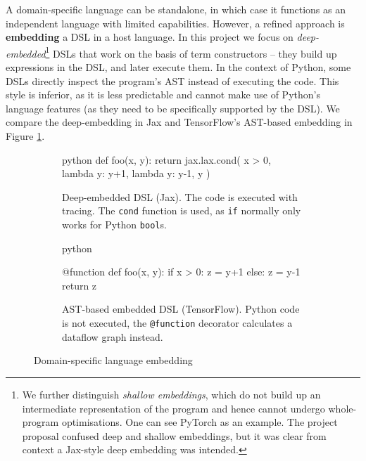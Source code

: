 A domain-specific language can be standalone, in which case it functions as an independent language with limited capabilities. 
However, a refined approach is \textbf{embedding} a DSL in a host language. 
In this project we focus on \textit{deep-embedded}\footnote{We further distinguish \textit{shallow embeddings}, which do not build up an intermediate representation of the program \cite{gibbons2014folding} and hence cannot undergo whole-program optimisations. One can see PyTorch as an example. The project proposal confused deep and shallow embeddings, but it was clear from context a Jax-style deep embedding was intended.} DSLs that work on the basis of term constructors -- they build up expressions in the DSL, and later execute them. 
In the context of Python, some DSLs directly inspect the program's AST instead of executing the code. 
This style is inferior, as it is less predictable and cannot make use of Python's language features (as they need to be specifically supported by the DSL). 
We compare the deep-embedding in Jax and TensorFlow's AST-based embedding in Figure \ref{fig:embeddings}.

\begin{figure}
\centering
\begin{subfigure}{.4\textwidth}
  \centering
  \begin{cminted}{python}
def foo(x, y):
  return jax.lax.cond(
    x > 0, 
    lambda y: y+1, 
    lambda y: y-1, 
    y
  )
  \end{cminted}
  \caption{Deep-embedded DSL (Jax). The code is executed with tracing. The \texttt{cond} function is used, as \texttt{if} normally only works for Python \texttt{bool}s.}
\end{subfigure} \quad %
\begin{subfigure}{.4\textwidth}
  \centering
    \begin{cminted}{python}

@function
def foo(x, y):
  if x > 0: z = y+1
  else:     z = y-1
  return z

    \end{cminted}
      \caption{AST-based embedded DSL (TensorFlow). Python code is not executed, the \texttt{@function} decorator calculates a dataflow graph instead.}
\end{subfigure}
\caption{Domain-specific language embedding}
\label{fig:embeddings}
\end{figure}

